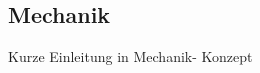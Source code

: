 \documentclass[main.tex]{subfiles} %
\begin{document}

\subsection{Mechanik}

Kurze Einleitung in Mechanik- Konzept


\newpage


\newpage


\newpage
\end{document}

